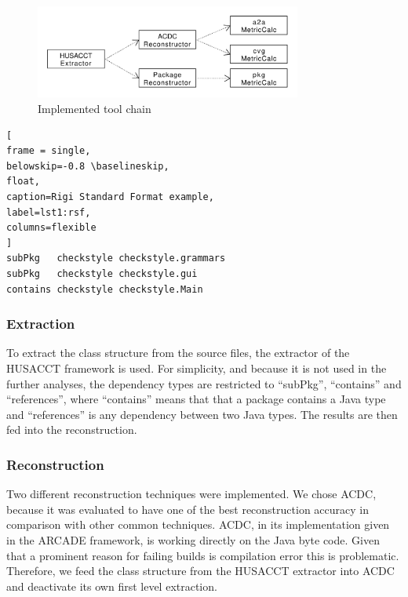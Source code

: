 \documentclass[sigplan, anonymous, review]{acmart}
\begin{document}
\begin{figure}[!t]
	\centering
	\includegraphics[width=3.45in]{assets/implementedArc.pdf}
	\caption{Implemented tool chain}
	\label{implToolchain}
\end{figure}

\begin{lstlisting}[
frame = single, 
belowskip=-0.8 \baselineskip,
float,
caption=Rigi Standard Format example,
label=lst1:rsf,
columns=flexible
]
subPkg   checkstyle checkstyle.grammars
subPkg   checkstyle checkstyle.gui
contains checkstyle checkstyle.Main
\end{lstlisting}



\subsubsection{Extraction}

To extract the class structure from the source files, the extractor of the HUSACCT framework is used. For simplicity, and because it is not used in the further analyses, the dependency types are restricted to ``subPkg'', ``contains'' and ``references'', where ``contains'' means that that a package contains a Java type and ``references'' is any dependency between two Java types. The results are then fed into the reconstruction.

\subsubsection{Reconstruction}

Two different reconstruction techniques were implemented. We chose ACDC, because it was evaluated to have one of the best reconstruction accuracy \cite{arcRec-comparison} in comparison with other common techniques. ACDC, in its implementation given in the ARCADE framework, is working directly on the Java byte code. Given that a prominent reason for failing builds is compilation error this is problematic. Therefore, we feed the class structure from the HUSACCT extractor into ACDC and deactivate its own first level extraction.
\end{document}
